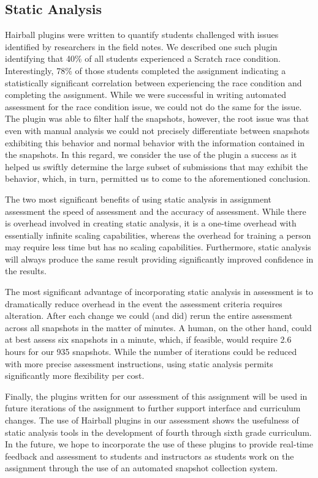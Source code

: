 \subsection{Static Analysis}
Hairball plugins were written to quantify students challenged with issues
identified by researchers in the field notes. We described one such plugin
identifying that 40\% of all students experienced a Scratch race
condition. Interestingly, 78\% of those students completed the assignment
indicating a statistically significant correlation between experiencing the
race condition and completing the assignment. While we were successful in
writing automated assessment for the race condition issue, we could not do the
same for the \dce{} issue. The plugin was able to filter half the snapshots,
however, the root issue was that even with manual analysis we could not
precisely differentiate between snapshots exhibiting this behavior and normal
behavior with the information contained in the snapshots. In this regard, we
consider the use of the plugin a success as it helped us swiftly determine the
large subset of submissions that may exhibit the behavior, which, in turn,
permitted us to come to the aforementioned conclusion.

The two most significant benefits of using static analysis in assignment
assessment the speed of assessment and the accuracy of assessment. While there
is overhead involved in creating static analysis, it is a one-time overhead
with essentially infinite scaling capabilities, whereas the overhead for
training a person may require less time but has no scaling
capabilities. Furthermore, static analysis will always produce the same result
providing significantly improved confidence in the results.

The most significant advantage of incorporating static analysis in
assessment is to dramatically reduce overhead in the event the assessment
criteria requires alteration. After each change we could (and did) rerun the
entire assessment across all snapshots in the matter of minutes. A human, on
the other hand, could at best assess six snapshots in a minute, which, if
feasible, would require 2.6 hours for our 935 snapshots. While the number of
iterations could be reduced with more precise assessment instructions, using
static analysis permits significantly more flexibility per cost.

Finally, the plugins written for our assessment of this assignment will be used
in future iterations of the assignment to further support interface and
curriculum changes. The use of Hairball plugins in our assessment shows the
usefulness of static analysis tools in the development of fourth through sixth
grade curriculum. In the future, we hope to incorporate the use of these
plugins to provide real-time feedback and assessment to students and
instructors as students work on the assignment through the use of an automated
snapshot collection system.
